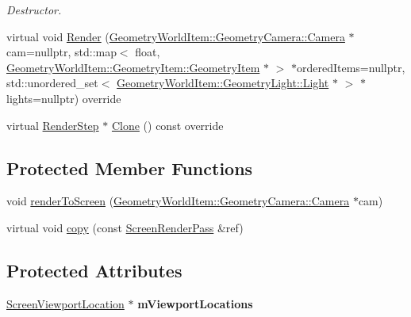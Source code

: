 \begin{DoxyCompactItemize}
\begin{DoxyCompactList}\small\item\em Destructor. \end{DoxyCompactList}\item 
virtual void \mbox{\hyperlink{class_geometry_engine_1_1_geometry_render_step_1_1_screen_render_pass_ac24f21e3a457408b2163bc51c2ebb8f2}{Render}} (\mbox{\hyperlink{class_geometry_engine_1_1_geometry_world_item_1_1_geometry_camera_1_1_camera}{Geometry\+World\+Item\+::\+Geometry\+Camera\+::\+Camera}} $\ast$cam=nullptr, std\+::map$<$ float, \mbox{\hyperlink{class_geometry_engine_1_1_geometry_world_item_1_1_geometry_item_1_1_geometry_item}{Geometry\+World\+Item\+::\+Geometry\+Item\+::\+Geometry\+Item}} $\ast$ $>$ $\ast$ordered\+Items=nullptr, std\+::unordered\+\_\+set$<$ \mbox{\hyperlink{class_geometry_engine_1_1_geometry_world_item_1_1_geometry_light_1_1_light}{Geometry\+World\+Item\+::\+Geometry\+Light\+::\+Light}} $\ast$ $>$ $\ast$lights=nullptr) override
\item 
virtual \mbox{\hyperlink{class_geometry_engine_1_1_geometry_render_step_1_1_render_step}{Render\+Step}} $\ast$ \mbox{\hyperlink{class_geometry_engine_1_1_geometry_render_step_1_1_screen_render_pass_a125bea5e92ff920b57012f9b0b177a1e}{Clone}} () const override
\end{DoxyCompactItemize}
\subsection*{Protected Member Functions}
\begin{DoxyCompactItemize}
\item 
void \mbox{\hyperlink{class_geometry_engine_1_1_geometry_render_step_1_1_screen_render_pass_a6a1f221c4b08fd2eae86e359e9b84829}{render\+To\+Screen}} (\mbox{\hyperlink{class_geometry_engine_1_1_geometry_world_item_1_1_geometry_camera_1_1_camera}{Geometry\+World\+Item\+::\+Geometry\+Camera\+::\+Camera}} $\ast$cam)
\item 
virtual void \mbox{\hyperlink{class_geometry_engine_1_1_geometry_render_step_1_1_screen_render_pass_a38fa6de5c3c8a46b365b59d3e29267b7}{copy}} (const \mbox{\hyperlink{class_geometry_engine_1_1_geometry_render_step_1_1_screen_render_pass}{Screen\+Render\+Pass}} \&ref)
\end{DoxyCompactItemize}
\subsection*{Protected Attributes}
\begin{DoxyCompactItemize}
\item 
\mbox{\label{class_geometry_engine_1_1_geometry_render_step_1_1_screen_render_pass_aa46da716412cf90640a9323e82e6975e}} 
\mbox{\hyperlink{class_geometry_engine_1_1_geometry_render_step_1_1_screen_viewport_location}{Screen\+Viewport\+Location}} $\ast$ {\bfseries m\+Viewport\+Locations}
\end{DoxyCompactItemize}


